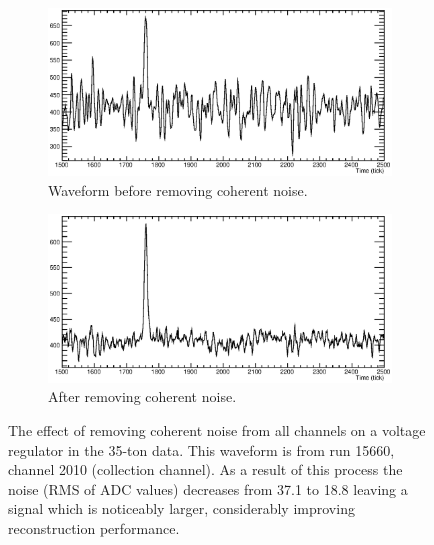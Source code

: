 \begin{figure}
  \centering
  \begin{subfigure}[t]{0.48\linewidth}
    \centering
    \includegraphics[width=\textwidth]{raw_noise.eps}
    \caption{Waveform before removing coherent noise.}
    \label{fig:CoherentNoiseRemovalNoise}
  \end{subfigure}
  \hfill
  \begin{subfigure}[t]{0.48\linewidth}
    \centering
    \includegraphics[width=\textwidth]{raw_nonoise.eps}
    \caption{After removing coherent noise.}
    \label{fig:CoherentNoiseRemovalNoNoise}
  \end{subfigure}
  \caption[The effect of removing coherent noise from all channels on a voltage regulator in the 35-ton data.]{The effect of removing coherent noise from all channels on a voltage regulator in the 35-ton data.  This waveform is from run 15660, channel 2010 (collection channel).  As a result of this process the noise (RMS of ADC values) decreases from 37.1 to 18.8 leaving a signal which is noticeably larger, considerably improving reconstruction performance.}
  \label{fig:CoherentNoiseRemoval}
\end{figure}

